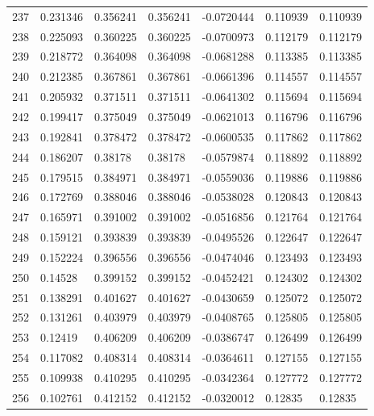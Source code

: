 \begin{longtable}{l|lll|lll}
 237 &  0.231346    & 0.356241    & 0.356241    & -0.0720444   & 0.110939    & 0.110939    \\
 238 &  0.225093    & 0.360225    & 0.360225    & -0.0700973   & 0.112179    & 0.112179    \\
 239 &  0.218772    & 0.364098    & 0.364098    & -0.0681288   & 0.113385    & 0.113385    \\
 240 &  0.212385    & 0.367861    & 0.367861    & -0.0661396   & 0.114557    & 0.114557    \\
 241 &  0.205932    & 0.371511    & 0.371511    & -0.0641302   & 0.115694    & 0.115694    \\
 242 &  0.199417    & 0.375049    & 0.375049    & -0.0621013   & 0.116796    & 0.116796    \\
 243 &  0.192841    & 0.378472    & 0.378472    & -0.0600535   & 0.117862    & 0.117862    \\
 244 &  0.186207    & 0.38178     & 0.38178     & -0.0579874   & 0.118892    & 0.118892    \\
 245 &  0.179515    & 0.384971    & 0.384971    & -0.0559036   & 0.119886    & 0.119886    \\
 246 &  0.172769    & 0.388046    & 0.388046    & -0.0538028   & 0.120843    & 0.120843    \\
 247 &  0.165971    & 0.391002    & 0.391002    & -0.0516856   & 0.121764    & 0.121764    \\
 248 &  0.159121    & 0.393839    & 0.393839    & -0.0495526   & 0.122647    & 0.122647    \\
 249 &  0.152224    & 0.396556    & 0.396556    & -0.0474046   & 0.123493    & 0.123493    \\
 250 &  0.14528     & 0.399152    & 0.399152    & -0.0452421   & 0.124302    & 0.124302    \\
 251 &  0.138291    & 0.401627    & 0.401627    & -0.0430659   & 0.125072    & 0.125072    \\
 252 &  0.131261    & 0.403979    & 0.403979    & -0.0408765   & 0.125805    & 0.125805    \\
 253 &  0.12419     & 0.406209    & 0.406209    & -0.0386747   & 0.126499    & 0.126499    \\
 254 &  0.117082    & 0.408314    & 0.408314    & -0.0364611   & 0.127155    & 0.127155    \\
 255 &  0.109938    & 0.410295    & 0.410295    & -0.0342364   & 0.127772    & 0.127772    \\
 256 &  0.102761    & 0.412152    & 0.412152    & -0.0320012   & 0.12835     & 0.12835     \\

\end{longtable}
